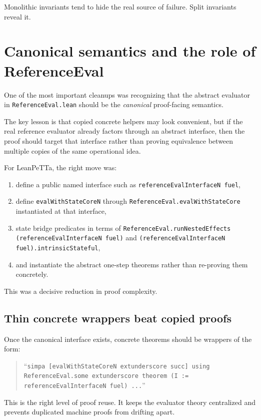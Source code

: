 \documentclass[11pt]{article}
\newcommand{\code}[1]{\texttt{#1}}
\newcommand{\term}[1]{\emph{#1}}
\begin{document}
Monolithic invariants tend to hide the real source of failure. Split invariants reveal it.

\section{Canonical semantics and the role of ReferenceEval}

One of the most important cleanups was recognizing that the abstract evaluator in \code{ReferenceEval.lean} should be the \term{canonical} proof-facing semantics.

The key lesson is that copied concrete helpers may look convenient, but if the real reference evaluator already factors through an abstract interface, then the proof should target that interface rather than proving equivalence between multiple copies of the same operational idea.

For LeanPeTTa, the right move was:

\begin{enumerate}
  \item define a public named interface such as \code{referenceEvalInterfaceN fuel},
  \item define \code{evalWithStateCoreN} through \code{ReferenceEval.evalWithStateCore} instantiated at that interface,
  \item state bridge predicates in terms of \code{ReferenceEval.runNestedEffects (referenceEvalInterfaceN fuel)} and \code{(referenceEvalInterfaceN fuel).intrinsicStateful},
  \item and instantiate the abstract one-step theorems rather than re-proving them concretely.
\end{enumerate}

This was a decisive reduction in proof complexity.

\subsection{Thin concrete wrappers beat copied proofs}

Once the canonical interface exists, concrete theorems should be wrappers of the form:

\begin{quote}
``\code{simpa [evalWithStateCoreN	extunderscore succ] using ReferenceEval.some	extunderscore theorem (I := referenceEvalInterfaceN fuel) ...}''
\end{quote}

This is the right level of proof reuse. It keeps the evaluator theory centralized and prevents duplicated machine proofs from drifting apart.
\end{document}
